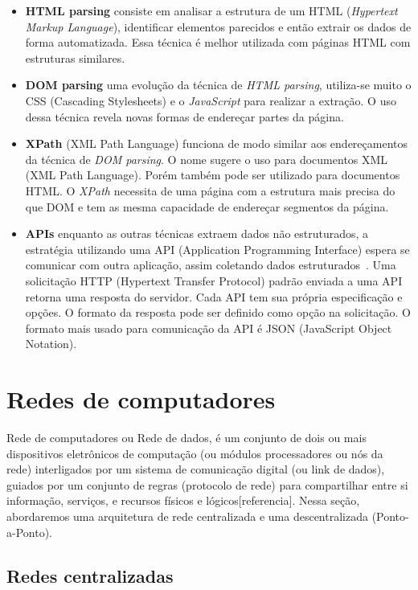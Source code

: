 \begin{itemize}
    \item \textbf{HTML parsing} consiste em analisar a estrutura de um HTML (\textit{Hypertext Markup Language}), identificar elementos parecidos e então extrair os dados de forma automatizada. 
    Essa técnica é melhor utilizada com páginas HTML com estruturas similares.
    \item \textbf{DOM parsing} uma evolução da técnica de \textit{HTML parsing}, utiliza-se muito o CSS (Cascading Stylesheets) e o \textit{JavaScript} para  realizar a extração. O uso dessa técnica revela novas formas de endereçar partes da página.
    \item \textbf{XPath} (XML Path Language) funciona de modo similar aos endereçamentos da técnica de \textit{DOM parsing}.
    O nome sugere o uso para documentos XML (XML Path Language).
    Porém também pode ser utilizado para documentos HTML.
    O \textit{XPath} necessita de uma página com a estrutura mais precisa do que DOM e tem as mesma capacidade de endereçar segmentos da página.
    \item \textbf{APIs} enquanto as outras técnicas extraem dados não estruturados, a estratégia utilizando uma API (Application Programming Interface) espera se comunicar com outra aplicação, assim coletando dados estruturados~\cite{Scraping2}.
    Uma solicitação HTTP (Hypertext Transfer Protocol) padrão enviada a uma API retorna uma resposta do servidor.
    Cada API tem sua própria especificação e opções.
    O formato da resposta pode ser definido como opção na solicitação.
    O formato mais usado para comunicação da API é JSON (JavaScript Object Notation).
\end{itemize}

\section{Redes de computadores}

Rede de computadores ou Rede de dados, é um conjunto de dois ou mais dispositivos eletrônicos de computação (ou módulos processadores ou nós da rede) interligados por um sistema de comunicação digital (ou link de dados), guiados por um conjunto de regras (protocolo de rede) para compartilhar entre si informação, serviços, e recursos físicos e lógicos[referencia].
Nessa seção, abordaremos uma arquitetura de rede centralizada e uma descentralizada (Ponto-a-Ponto).

\subsection{Redes centralizadas}

